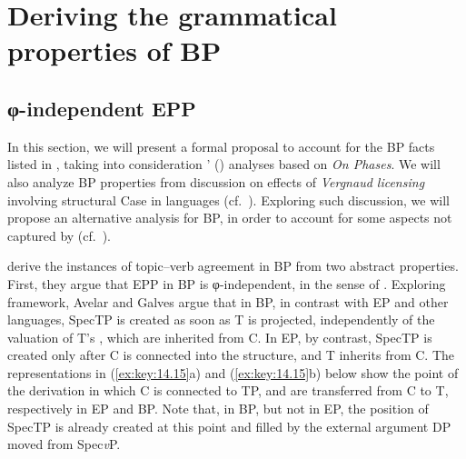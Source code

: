 \documentclass[output=paper]{langsci/langscibook}
\begin{document}
\section{Deriving the grammatical properties of BP}\label{sec:key:14.4}

\subsection{φ-independent EPP}\label{sec:key:14.4.1}

In this section, we will present a formal proposal to account for the \gls{BP}
facts listed in , taking into consideration
\citeauthor{AvelarGalves2011}' (\citeyear{AvelarGalves2011,AvelarGalves2016}) analyses based on  \emph{On Phases}.
We will also analyze \gls{BP} properties from
 discussion on effects of \emph{Vergnaud licensing}
involving structural Case in  languages (cf.\ ).
Exploring such discussion, we will propose an alternative analysis for BP, in
order to account for some aspects not captured by
\textcite{AvelarGalves2011,AvelarGalves2016} (cf.\ ).

\textcite{AvelarGalves2011,AvelarGalves2016} derive the instances of
topic--verb agreement in \gls{BP} from two
abstract properties. First, they argue that \gls{EPP} in \gls{BP} is
φ-independent, in the sense of \citet{Holmberg2010}. Exploring
 framework, Avelar and Galves argue that in BP, in
contrast with \gls{EP} and other  languages, SpecTP is created as soon
as T is projected, independently of the valuation of T’s , which are
inherited from C. In EP, by contrast, SpecTP is created only after C is
connected into the structure, and T inherits  from C.  The
representations in (\ref{ex:key:14.15}a) and (\ref{ex:key:14.15}b) below show
the point of the derivation in which C is connected to TP, and  are
transferred from C to T, respectively in \gls{EP} and BP.  Note that, in BP,
but not in EP, the position of SpecTP is already created at this point and
filled by the external argument DP moved from Spec\emph{v}P.
\end{document}
